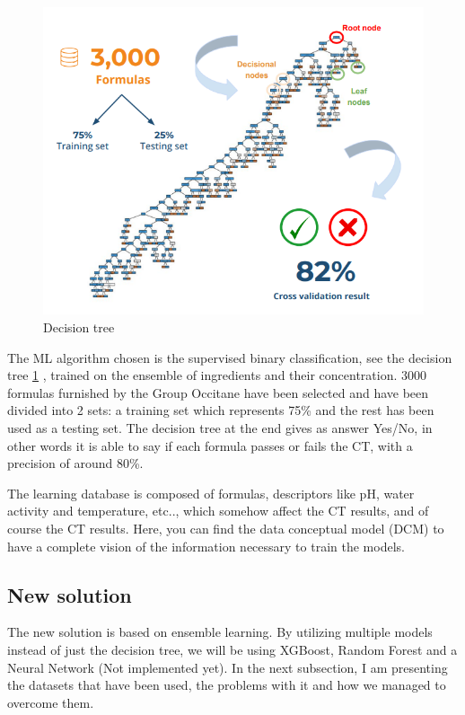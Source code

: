 \documentclass[a4paper,12pt,twoside]{report}
\begin{document}
\begin{figure}
		\includegraphics[width=\textwidth]{images/binaryTree}
	\caption[Current Decision Tree for CT prediction]{Decision tree}
\label{Decision tree}
\end{figure}
The ML algorithm chosen is the supervised binary classification, see the decision tree \ref{Decision tree} , trained on the ensemble of ingredients and their concentration. 3000 formulas furnished by the Group Occitane have been selected and have been divided into 2 sets: a training set which represents 75\% and the rest has been used as a testing set.
The decision tree at the end gives as answer Yes/No, in other words it is able to say if each formula passes or fails the CT, with a precision of around 80\%.

The learning database is composed of formulas, descriptors like pH, water activity and temperature, etc.., which somehow affect the CT results, and of course the CT results. Here, you can find the data conceptual model (DCM) to have a complete vision of the information necessary to train the models.
\subsection{New solution}
The new solution is based on ensemble learning. By utilizing multiple models instead of just the decision tree, we will be using XGBoost, Random Forest and a Neural Network (Not implemented yet). In the next subsection, I am presenting the datasets that have been used, the problems with it and how we managed to overcome them.
\end{document}
